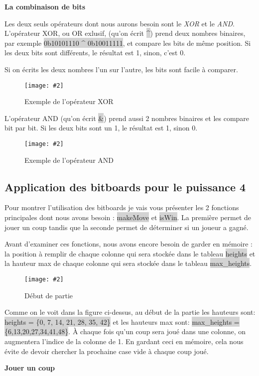 \documentclass[a4paper]{article}
\newcommand{\img}[3][]{
    \begin{figure}[H]
        \centering
        \texttt{[image: \#2]}
        \caption{#1}    
    \end{figure}
}
\newcommand{\inlinecode}[1]{\colorbox{lightgray}{#1}}
\newcommand{\ptitle}[1]{\vspace{10pt}
{\large \noindent \textbf{#1}}}
\begin{document}
    
    \ptitle{La combinaison de bits}

    Les deux seuls opérateurs dont nous aurons besoin sont le \textit{XOR} et le \textit{AND}. L'opérateur XOR, ou OR exlusif, (qu'on écrit \inlinecode{\^{}}) prend deux nombres binaires, par exemple \inlinecode{0b10101110 \^{} 0b10011111}, et compare les bits de même position. Si les deux bits sont différents, le résultat est 1, sinon, c'est 0.

    Si on écrits les deux nombres l'un sur l'autre, les bits sont facile à comparer.
    \img[Exemple de l'opérateur XOR]{Images/XORExemple.png}{0.15}

    L'opérateur AND (qu'on écrit \inlinecode{\&}) prend aussi 2 nombres binaires et les compare bit par bit. Si les deux bits sont un 1, le résultat est 1, sinon 0.
    \img[Exemple de l'opérateur AND]{Images/ANDExemple.png}{0.15}

\subsection{Application des bitboards pour le puissance 4}

    Pour montrer l'utilisation des bitboards je vais vous présenter les 2 fonctions principales dont nous avons besoin : \inlinecode{makeMove} et \inlinecode{isWin}. La première permet de jouer un coup tandis que la seconde permet de déterminer si un joueur a gagné.

    Avant d'examiner ces fonctions, nous avons encore besoin de garder en mémoire : la position à remplir de chaque colonne qui sera stockée dans le tableau \inlinecode{heights} et la hauteur max de chaque colonne qui sera stockée dans le tableau \inlinecode{max\_heights}.

    \img[Début de partie]{Images/EmptyBoard.png}{0.4}

    Comme on le voit dans la figure ci-dessus, au début de la partie les hauteurs sont: \newline\inlinecode{heights = \{0, 7, 14, 21, 28, 35, 42\}} et les hauteurs max sont: \inlinecode{max\_heights = \{6,13,20,27,34,41,48\}}. À chaque fois qu'un coup sera joué dans une colonne, on augmentera l'indice de la colonne de 1. En gardant ceci en mémoire, cela nous évite de devoir chercher la prochaine case vide à chaque coup joué.

    \ptitle{Jouer un coup}
\end{document}
